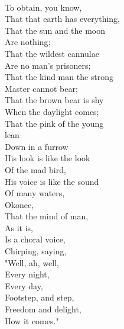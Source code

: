 \documentclass[smalldemyvopaper,11pt,twoside,onecolumn,openright,extrafontsizes]{memoir}
\begin{document}
\\To obtain, you know,
\\That that earth has everything,
\\That the sun and the moon
\\Are nothing;
\\That the wildest cannulae
\\Are no man's prisoners;
\\That the kind man the strong
\\Master cannot bear;
\\That the brown bear is shy
\\When the daylight comes;
\\That the pink of the young
\\lean
\\Down in a furrow
\\His look is like the look
\\Of the mad bird,
\\His voice is like the sound
\\Of many waters,
\\Okonee,
\\That the mind of man,
\\As it is,
\\Is a choral voice,
\\Chirping, saying,
\\"Well, ah, well,
\\Every night,
\\Every day,
\\Footstep, and step,
\\Freedom and delight,
\\How it comes."
\end{document}
